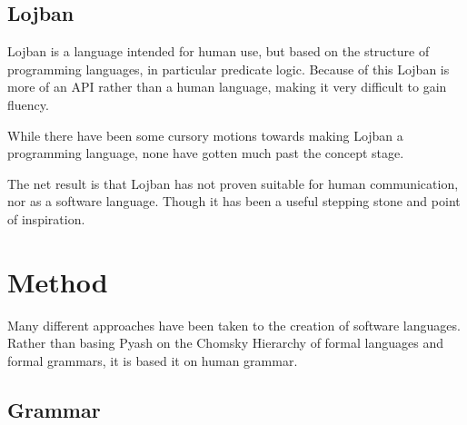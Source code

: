 % 
% 

\subsection{Lojban}
Lojban is a language intended for human use, but based on the structure of
programming languages, in particular predicate logic\cite{LojbanIntro}.
Because of this Lojban is more of an API rather than a human language, making it
very difficult to gain fluency\cite{LojbanProblem}\cite{okrent2010in}.

While there have been some cursory motions towards making Lojban a programming
language\cite{LojbanPlus}, none have gotten much past the concept stage. 

The net result is that Lojban has not proven suitable for human communication, 
nor as a software language.  Though it has been a useful stepping stone and
point of inspiration.  

\section{Method}

Many different approaches have been taken to the creation of software languages. 
Rather than basing Pyash on the Chomsky Hierarchy of formal languages and formal
grammars, it is based it on human grammar. 

\subsection{Grammar}\label{grammar}

